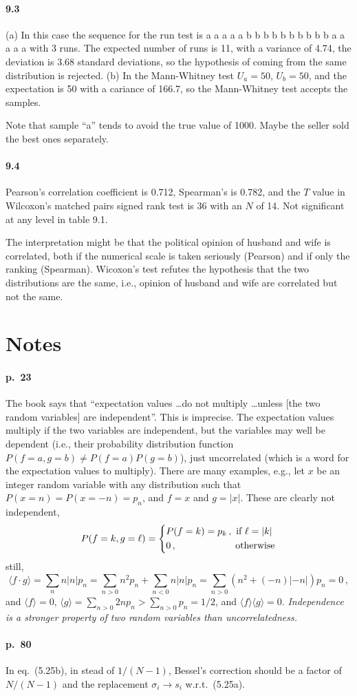 \documentclass[a4paper,12pt]{article}
\begin{document}
\paragraph{9.3} (a) In this case the sequence for the run test is a a a a a b b b b b b b b b b a a a a a with 3 runs. The expected number of runs is  11, with a variance of 4.74, the deviation is 3.68 standard deviations, so the hypothesis of coming from the same distribution is rejected. (b) In the Mann-Whitney test $U_a=50$, $U_b=50$, and the expectation is 50 with a cariance of 166.7, so the Mann-Whitney test accepts the samples.

Note that sample ``a'' tends to avoid the true value of 1000. Maybe the seller sold the best ones separately.

\paragraph{9.4} Pearson's correlation coefficient is 0.712, Spearman's is 0.782, and the $T$ value in Wilcoxon's matched pairs signed rank test is 36 with an $N$ of 14. Not significant at any level in table 9.1.

The interpretation might be that the political opinion of husband and wife is correlated, both if the numerical scale is taken seriously (Pearson) and if only the ranking (Spearman). Wicoxon's test refutes the hypothesis that the two distributions are the same, i.e., opinion of husband and wife are correlated but not the same. 


\section*{Notes}
\paragraph{p.\ 23} The book says that ``expectation values \dots do not multiply \dots unless [the two random variables] are independent''. This is imprecise. The expectation values multiply if the two variables are independent, but the variables may well be dependent (i.e., their probability distribution function $P(f=a, g=b) \ne P(f=a) P(g=b)$), just uncorrelated (which is a word for the expectation values to multiply). There are many examples, e.g., let $x$ be an integer random variable with any distribution such that $P(x=n) = P(x=-n) = p_n$, and $f=x$ and $g=|x|$. These are clearly not independent,
\[
 P(f=k, g=\ell) = \left\{
 \begin{aligned}
  &P(f=k) = p_k\,,\text{\ if } \ell=|k| \\
  &0\,,\hspace{5.8em}\text{\ otherwise}
 \end{aligned}
 \right.
\]
still,
\[
 \langle f\cdot g\rangle = \sum_{n} n |n| p_n = \sum_{n>0} n^2 p_n + \sum_{n<0} n|n| p_n = \sum_{n>0} (n^2 + (-n)|-n|) p_n = 0\,,
\]
and $\langle f\rangle = 0$, $\langle g \rangle =\sum_{n>0}2n p_n > \sum_{n>0} p_n = 1/2$, and $\langle f \rangle \langle g \rangle = 0$.
\emph{Independence is a stronger property of two random variables than uncorrelatedness.}


\paragraph{p.\ 80} In eq.\ (5.25b), in stead of $1/(N-1)$, Bessel's correction should be a factor of $N/(N-1)$ and the replacement $\sigma_i \to s_i$ w.r.t.\ (5.25a).
\end{document}
